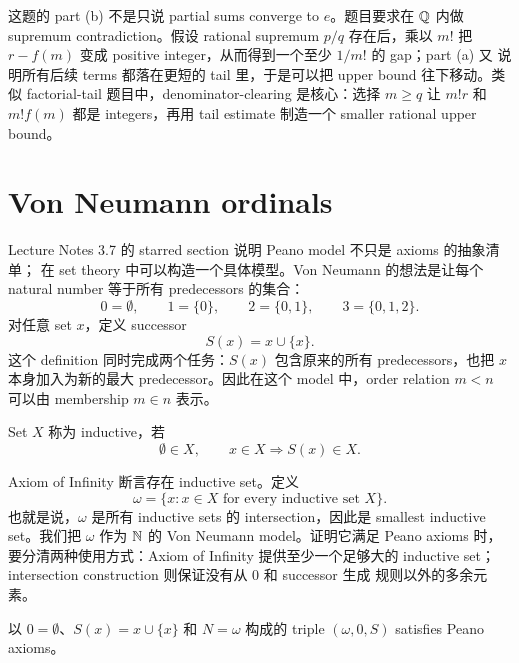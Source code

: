\begin{explanation}
这题的 part (b) 不是只说 partial sums converge to \(e\)。题目要求在 \(\mathbb{Q}\) 内做
supremum contradiction。假设 rational supremum \(p/q\) 存在后，乘以 \(m!\) 把
\(r-f(m)\) 变成 positive integer，从而得到一个至少 \(1/m!\) 的 gap；part (a) 又
说明所有后续 terms 都落在更短的 tail 里，于是可以把 upper bound 往下移动。类似
factorial-tail 题目中，denominator-clearing 是核心：选择 \(m\ge q\) 让 \(m!r\)
和 \(m!f(m)\) 都是 integers，再用 tail estimate 制造一个 smaller rational upper
bound。
\end{explanation}

\section{Von Neumann ordinals \optional}

Lecture Notes 3.7 的 starred section 说明 Peano model 不只是 axioms 的抽象清单；
在 set theory 中可以构造一个具体模型。Von Neumann 的想法是让每个 natural number
等于所有 predecessors 的集合：
\[
  0=\emptyset,\qquad
  1=\{0\},\qquad
  2=\{0,1\},\qquad
  3=\{0,1,2\}.
\]
对任意 set \(x\)，定义 successor
\[
  S(x)=x\cup\{x\}.
\]
这个 definition 同时完成两个任务：\(S(x)\) 包含原来的所有 predecessors，也把
\(x\) 本身加入为新的最大 predecessor。因此在这个 model 中，order relation
\(m<n\) 可以由 membership \(m\in n\) 表示。

\begin{definition}
Set \(X\) 称为 inductive，若
\[
  \emptyset\in X,\qquad x\in X\Rightarrow S(x)\in X.
\]
\end{definition}

Axiom of Infinity 断言存在 inductive set。定义
\[
  \omega=\{x:x\in X\text{ for every inductive set }X\}.
\]
也就是说，\(\omega\) 是所有 inductive sets 的 intersection，因此是 smallest
inductive set。我们把 \(\omega\) 作为 \(\mathbb{N}\) 的 Von Neumann model。证明它满足
Peano axioms 时，要分清两种使用方式：Axiom of Infinity 提供至少一个足够大的
inductive set；intersection construction 则保证没有从 \(0\) 和 successor 生成
规则以外的多余元素。

\begin{proposition}
以 \(0=\emptyset\)、\(S(x)=x\cup\{x\}\) 和 \(N=\omega\) 构成的 triple
\((\omega,0,S)\) satisfies Peano axioms。
\end{proposition}

